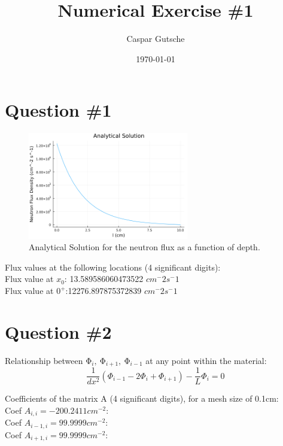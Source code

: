 \documentclass[11pt,a4paper]{article}
\begin{document}
\title{Numerical Exercise \#1}
\author{Caspar Gutsche\\  %
}
\date{\today}
\maketitle



\newpage
\section{Question \#1}
\begin{figure}[h]
\includegraphics[width=7cm]{../figs/ex1_analytical.png}
\centering
\caption{Analytical Solution for the neutron flux as a function of depth.}
\end{figure}
Flux values at the following locations (4 significant digits):\\
Flux value at $x_0$: 13.589586060473522 $cm^-2 s^-1$\\
Flux value at $0^+$:12276.897875372839  $cm^-2 s^-1$ \\


\section{Question \#2}

Relationship between $\mathrm{\Phi}_i,\ \mathrm{\Phi}_{i+1},\ \mathrm{\Phi}_{i-1}$ at any point within the material:
\begin{equation}
    \frac{1}{dx^2}(\Phi_{i-1} - 2 \Phi_{i} + \Phi_{i+1}) - \frac{1}{L} \Phi_{i} = 0
\end{equation}

Coefficients of the matrix A (4 significant digits), for a mesh size of 0.1cm:\\
Coef ${} A_{i,i} = -200.2411 cm^{-2}$: \\
Coef $A_{i-1,i} = 99.9999 cm^{-2}$: \\
Coef $A_{i+1,i} = 99.9999 cm^{-2}$: \\
\end{document}
